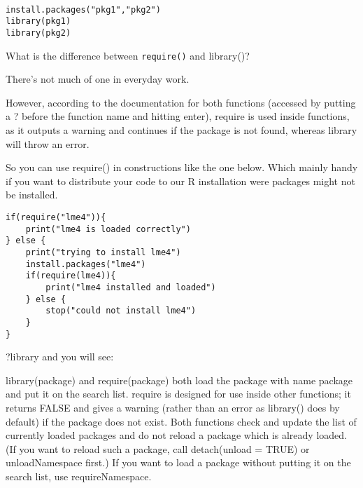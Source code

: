 \documentclass{beamer}
\begin{document}
\begin{frame}[fragile]

\begin{framed}
\begin{verbatim}

install.packages("pkg1","pkg2")
library(pkg1)
library(pkg2)

\end{verbatim}
\end{framed}



What is the difference between \texttt{require()} and library()?

There's not much of one in everyday work.

However, according to the documentation for both functions (accessed by putting a ? before the function name and hitting enter), require is used inside functions, as it outputs a warning and continues if the package is not found, whereas library will throw an error.

So you can use require() in constructions like the one below. Which mainly handy if you want to distribute your code to our R installation were packages might not be installed.
\begin{framed}
\begin{verbatim}
if(require("lme4")){
    print("lme4 is loaded correctly")
} else {
    print("trying to install lme4")
    install.packages("lme4")
    if(require(lme4)){
        print("lme4 installed and loaded")
    } else {
        stop("could not install lme4")
    }
}

\end{verbatim}
\end{framed}
?library
and you will see:


library(package) and require(package) both load the package with name package and put it on the search list. require is designed for use inside other functions; it returns FALSE and gives a warning (rather than an error as library() does by default) if the package does not exist. Both functions check and update the list of currently loaded packages and do not reload a package which is already loaded. (If you want to reload such a package, call detach(unload = TRUE) or unloadNamespace first.) If you want to load a package without putting it on the search list, use requireNamespace.


\end{frame}
\end{document}
